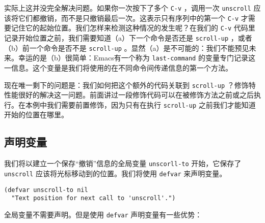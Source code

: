 实际上这并没完全解决问题。如果你一次按下了多个 \verb|C-v| ，调用一次 \texttt{unscroll} 应该将它们都撤销，而不是只撤销最后一次。这表示只有序列中的第一个 \verb|C-v| 才需要记住它的起始位置。我们怎样来检测这种情况的发生呢？在我们的 \verb|C-v| 代码里记录开始位置之前，我们需要知道（a）下一个命令是否还是 \texttt{scroll-up} ，或者（b）前一个命令是否不是 \texttt{scroll-up} 。显然（a）是不可能的：我们不能预见未来。幸运的是（b）很简单：Emacs有一个称为 \texttt{last-command} 的变量专门记录这一信息。这个变量是我们将使用的在不同命令间传递信息的第一个方法。

现在唯一剩下的问题是：我们如何把这个额外的代码关联到 \texttt{scroll-up} ？修饰特性能很好的解决这一问题。前面讲过一段修饰代码可以在被修饰方法之前或之后执行。在本例中我们需要前置修饰，因为只有在执行 \texttt{scroll-up} 之前我们才能知道开始的位置在哪里。

\subsection{声明变量}
\label{section:03-Declaring-Variables}

我们将以建立一个保存“撤销”信息的全局变量 \texttt{unscorll-to} 开始，它保存了 \texttt{unscroll} 应该将光标移动到的位置。我们将使用 \texttt{defvar} 来声明变量。

\begin{verbatim}
(defvar unscroll-to nil
  "Text position for next call to 'unscroll'.")
\end{verbatim}

全局变量不需要声明。但是使用 \texttt{defvar} 声明变量有一些优势：

